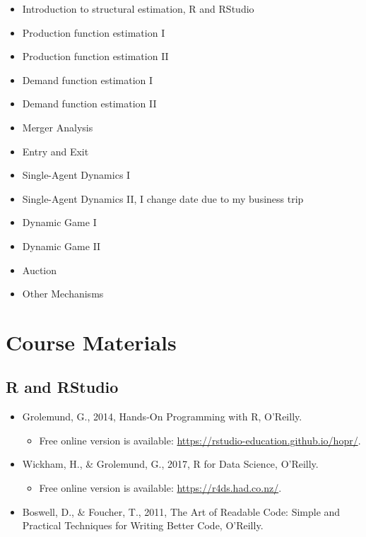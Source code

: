 \documentclass[]{book}
\providecommand{\tightlist}{%
  \setlength{\itemsep}{0pt}\setlength{\parskip}{0pt}}
\begin{document}
\begin{itemize}
\tightlist
\item
  Introduction to structural estimation, R and RStudio
\item
  Production function estimation I
\item
  Production function estimation II
\item
  Demand function estimation I
\item
  Demand function estimation II
\item
  Merger Analysis
\item
  Entry and Exit
\item
  Single-Agent Dynamics I
\item
  Single-Agent Dynamics II, I change date due to my business trip
\item
  Dynamic Game I
\item
  Dynamic Game II
\item
  Auction
\item
  Other Mechanisms
\end{itemize}

\section{Course Materials}\label{course-materials}

\subsection{R and RStudio}\label{r-and-rstudio}

\begin{itemize}
\tightlist
\item
  Grolemund, G., 2014, Hands-On Programming with R, O'Reilly.

  \begin{itemize}
  \tightlist
  \item
    Free online version is available:
    \url{https://rstudio-education.github.io/hopr/}.
  \end{itemize}
\item
  Wickham, H., \& Grolemund, G., 2017, R for Data Science, O'Reilly.

  \begin{itemize}
  \tightlist
  \item
    Free online version is available: \url{https://r4ds.had.co.nz/}.
  \end{itemize}
\item
  Boswell, D., \& Foucher, T., 2011, The Art of Readable Code: Simple
  and Practical Techniques for Writing Better Code, O'Reilly.
\end{itemize}
\end{document}
